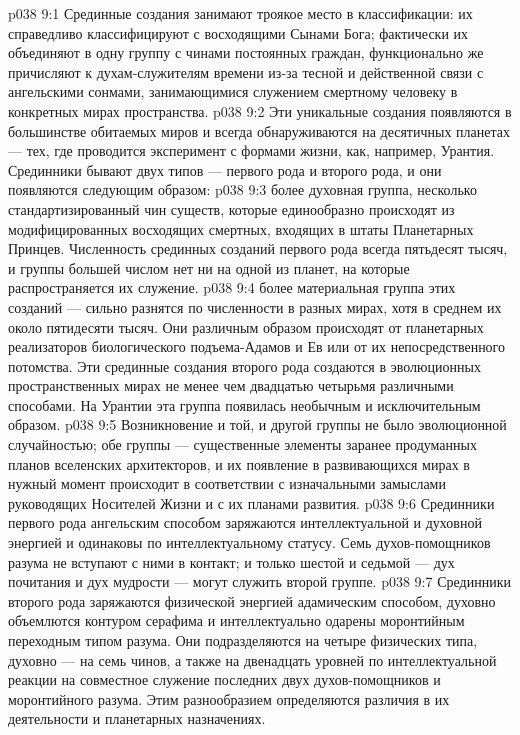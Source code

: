 \vs p038 9:1 Срединные создания занимают троякое место в классификации: их справедливо классифицируют с восходящими Сынами Бога; фактически их объединяют в одну группу с чинами постоянных граждан, функционально же причисляют к духам\hyp{}служителям времени из\hyp{}за тесной и действенной связи с ангельскими сонмами, занимающимися служением смертному человеку в конкретных мирах пространства.
\vs p038 9:2 Эти уникальные создания появляются в большинстве обитаемых миров и всегда обнаруживаются на десятичных планетах --- тех, где проводится эксперимент с формами жизни, как, например, Урантия. Срединники бывают двух типов --- первого рода и второго рода, и они появляются следующим образом:
\vs p038 9:3 \bibnobreakspace {} более духовная группа, несколько стандартизированный чин существ, которые единообразно происходят из модифицированных восходящих смертных, входящих в штаты Планетарных Принцев. Численность срединных созданий первого рода всегда пятьдесят тысяч, и группы большей числом нет ни на одной из планет, на которые распространяется их служение.
\vs p038 9:4 \pc {}\bibnobreakspace {} более материальная группа этих созданий --- сильно разнятся по численности в разных мирах, хотя в среднем их около пятидесяти тысяч. Они различным образом происходят от планетарных реализаторов биологического подъема\hyp{}Адамов и Ев или от их непосредственного потомства. Эти срединные создания второго рода создаются в эволюционных пространственных мирах не менее чем двадцатью четырьмя различными способами. На Урантии эта группа появилась необычным и исключительным образом.
\vs p038 9:5 \pc Возникновение и той, и другой группы не было эволюционной случайностью; обе группы --- существенные элементы заранее продуманных планов вселенских архитекторов, и их появление в развивающихся мирах в нужный момент происходит в соответствии с изначальными замыслами руководящих Носителей Жизни и с их планами развития.
\vs p038 9:6 Срединники первого рода ангельским способом заряжаются интеллектуальной и духовной энергией и одинаковы по интеллектуальному статусу. Семь духов\hyp{}помощников разума не вступают с ними в контакт; и только шестой и седьмой --- дух почитания и дух мудрости --- могут служить второй группе.
\vs p038 9:7 Срединники второго рода заряжаются физической энергией адамическим способом, духовно объемлются контуром серафима и интеллектуально одарены моронтийным переходным типом разума. Они подразделяются на четыре физических типа, духовно --- на семь чинов, а также на двенадцать уровней по интеллектуальной реакции на совместное служение последних двух духов\hyp{}помощников и моронтийного разума. Этим разнообразием определяются различия в их деятельности и планетарных назначениях.
